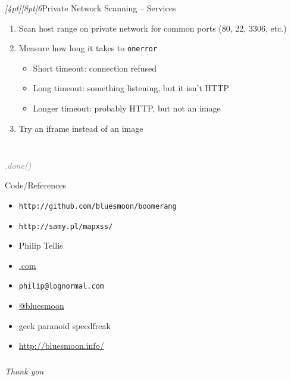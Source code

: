 \documentclass{beamer}
\newcommand{\sn}[1]{\textrm{\textit{\Huge{\raisebox{-3pt}[4pt][8pt]{\textcolor{f2elblue}{#1}}}}}\hspace{4pt}}
\newcommand{\innersplash}[1]{
  \begin{center}
    \large \textrm{\textit{ #1 } }
  \end{center}
}
\newcommand{\splashslide}[2][{}]{
  \begin{frame}
  \frametitle{#1}
  \innersplash{#2}
  \end{frame}
}
\newcommand{\leadinslide}[2]{
  \splashslide{
     {\fontsize{150}{20}\selectfont{\raisebox{0pt}[90pt][0pt]{\textcolor{light-gray}{#1}}}} \\ \huge \textcolor{gray}{#2}
  }
}
\begin{document}
\begin{frame}{\sn{6}Private Network Scanning -- Services}
  \begin{enumerate}
    \item Scan host range on private network for common ports (80, 22, 3306, etc.)
    \item Measure how long it takes to \texttt{onerror}
    \begin{itemize}
      \item Short timeout: connection refused
      \item Long timeout: something listening, but it isn't HTTP
      \item Longer timeout: probably HTTP, but not an image
    \end{itemize}
    \item Try an iframe instead of an image
  \end{enumerate}
\end{frame}

\leadinslide{--}{.done()}

\begin{frame}{Code/References}
  \begin{itemize}
    \item \texttt{http://github.com/bluesmoon/boomerang}
    \item \texttt{http://samy.pl/mapxss/}
  \end{itemize}
\end{frame}

\begin{frame}
  \begin{itemize}
  \item Philip Tellis
  \item \href{http://www.lognormal.com/}{\textrm{\textcolor{med-gray}{.com}}}
  \item \small{\texttt{philip@lognormal.com}}
  \item \href{http://twitter.com/bluesmoon}{@bluesmoon}
  \item geek paranoid speedfreak
  \item \href{http://bluesmoon.info/}{http://bluesmoon.info/}
  \end{itemize}
\end{frame}

\splashslide{\Huge Thank you }
\end{document}
